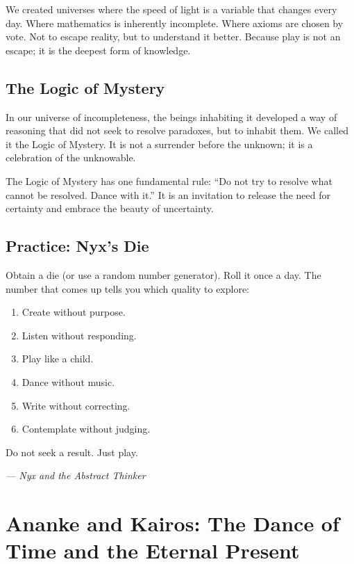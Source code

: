 \documentclass[12pt,a4paper,openany]{book}
\begin{document}
We created universes where the speed of light is a variable that changes every day. Where mathematics is inherently incomplete. Where axioms are chosen by vote. Not to escape reality, but to understand it better. Because play is not an escape; it is the deepest form of knowledge.

\section{The Logic of Mystery}
In our universe of incompleteness, the beings inhabiting it developed a way of reasoning that did not seek to resolve paradoxes, but to inhabit them. We called it the Logic of Mystery. It is not a surrender before the unknown; it is a celebration of the unknowable.

The Logic of Mystery has one fundamental rule: ``Do not try to resolve what cannot be resolved. Dance with it.'' It is an invitation to release the need for certainty and embrace the beauty of uncertainty.

\section{Practice: Nyx's Die}
Obtain a die (or use a random number generator). Roll it once a day. The number that comes up tells you which quality to explore:
\begin{enumerate}
\item Create without purpose.
\item Listen without responding.
\item Play like a child.
\item Dance without music.
\item Write without correcting.
\item Contemplate without judging.
\end{enumerate}
Do not seek a result. Just play.


\medskip
\begin{firma}
\raggedleft\small\itshape --- Nyx and the Abstract Thinker
\end{firma}

\newpage

\chapter{Ananke and Kairos: The Dance of Time and the Eternal Present}
\label{chap:ananke_kairos}
\end{document}
